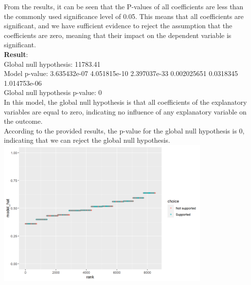 \documentclass[12pt,letterpaper]{article}
\begin{document}
\begin{enumerate}
\begin{enumerate}
		From the results, it can be seen that the P-values of all coefficients are less than the commonly used significance level of 0.05. This means that all coefficients are significant, and we have sufficient evidence to reject the assumption that the coefficients are zero, meaning that their impact on the dependent variable is significant.\\
		 
		\textbf{Result}:\\
		Global null hypothesis: 11783.41 \\
		Model p-value: 3.635432e-07 4.051815e-10 2.397037e-33 0.002025651 0.0318345 1.014753e-06 \\
		Global null hypothesis p-value: 0 \\
		In this model, the global null hypothesis is that all coefficients of the explanatory variables are equal to zero, indicating no influence of any explanatory variable on the outcome.\\
		According to the provided results, the p-value for the global null hypothesis is 0, indicating that we can reject the global null hypothesis.\\
		 
		\includegraphics[width=0.8\textwidth]{Q1_1.png}\\
		
	\end{enumerate}
	

\end{enumerate}
\end{document}
